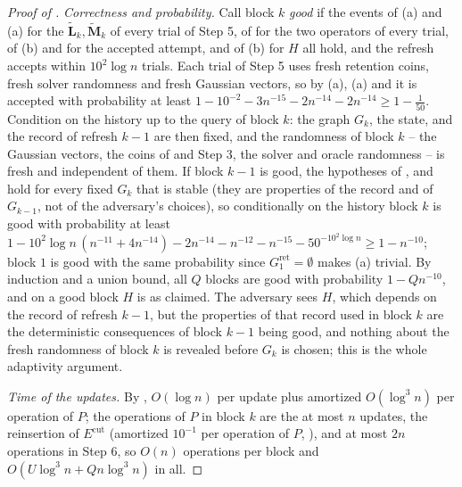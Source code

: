 \documentclass[11pt]{article}
\theoremstyle{remark}
\newcommand{\LL}{\mathbf L}
\newcommand{\LLtil}{{\widetilde{\LL}}}
\newcommand{\MM}{\mathbf M}
\newcommand{\MMtil}{{\widetilde{\MM}}}
\newcommand{\Ecut}{E^{\mathrm{cut}}}
\newcommand{\Gret}{G^{\mathrm{ret}}}
\begin{document}
\begin{proof}[Proof of ]
\emph{Correctness and probability.}
Call block $k$ \emph{good} if the events of (a) and
(a) for the $\LLtil_k,\MMtil_k$ of every trial of Step 5, of
 for the two operators of every trial, of
(b) and  for the accepted attempt, and of
(b) for $H$ all hold, and the refresh accepts within
$10^{2}\log n$ trials.
Each trial of Step 5 uses fresh retention coins, fresh solver randomness and
fresh Gaussian vectors, so by (a), (a)
and  it is accepted with probability at least
$1-10^{-2}-3n^{-15}-2n^{-14}-2n^{-14}\ge1-\frac1{50}$.
Condition on the history up to the query of block $k$: the graph $G_k$, the
state, and the record of refresh $k-1$ are then fixed, and the randomness
of block $k$ -- the Gaussian vectors, the coins of  and
Step 3, the solver and oracle randomness -- is fresh and independent of them.
If block $k-1$ is good, the hypotheses of ,
 and  hold for every fixed $G_k$
that is stable (they are properties of the record and of
$G_{k-1}$, not of the adversary's choices), so conditionally on the history
block $k$ is good with probability at least
$1-10^{2}\log n\,(n^{-11}+4n^{-14})-2n^{-14}-n^{-12}-n^{-15}-50^{-10^{2}\log n}\ge1-n^{-10}$;
block $1$ is good with the same probability since $\Gret_1=\emptyset$ makes
(a) trivial.
By induction and a union bound, all $Q$ blocks are good with probability
$1-Qn^{-10}$, and on a good block $H$ is as claimed.
The adversary sees $H$, which depends on the record of refresh $k-1$, but
the properties of that record used in block $k$ are the deterministic
consequences of block $k-1$ being good, and nothing about the fresh
randomness of block $k$ is revealed before $G_k$ is chosen; this is the
whole adaptivity argument.

\emph{Time of the updates.}
By , $O(\log n)$ per update plus amortized $O(\log^{3}n)$
per operation of $P$; the operations of $P$ in block $k$ are the at most $n$
updates, the reinsertion of $\Ecut$ (amortized $10^{-1}$ per operation of $P$,
), and at most $2n$ operations in Step 6, so $O(n)$
operations per block and $O(U\log^{3}n+Qn\log^{3}n)$ in all.


\end{proof}
\end{document}
